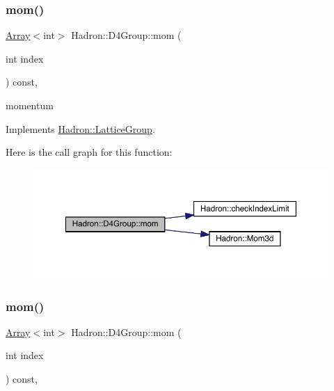 \subsubsection{\texorpdfstring{mom()}{mom()}\hspace{0.1cm}{\footnotesize\ttfamily [1/3]}}
{\footnotesize\ttfamily \mbox{\hyperlink{classXMLArray_1_1Array}{Array}}$<$int$>$ Hadron\+::\+D4\+Group\+::mom (\begin{DoxyParamCaption}\item[{int}]{index }\end{DoxyParamCaption}) const\hspace{0.3cm}{\ttfamily [inline]}, {\ttfamily [virtual]}}

momentum 

Implements \mbox{\hyperlink{structHadron_1_1LatticeGroup_ad577b65041dd9a6e84b1f3bd49cb8fce}{Hadron\+::\+Lattice\+Group}}.

Here is the call graph for this function\+:
\nopagebreak
\begin{figure}[H]
\begin{center}
\leavevmode
\includegraphics[width=350pt]{de/d5e/structHadron_1_1D4Group_aeb999dc93b1a1a99ed4ffd53977a163b_cgraph}
\end{center}
\end{figure}
\mbox{\label{structHadron_1_1D4Group_aeb999dc93b1a1a99ed4ffd53977a163b}} 
\subsubsection{\texorpdfstring{mom()}{mom()}\hspace{0.1cm}{\footnotesize\ttfamily [2/3]}}
{\footnotesize\ttfamily \mbox{\hyperlink{classXMLArray_1_1Array}{Array}}$<$int$>$ Hadron\+::\+D4\+Group\+::mom (\begin{DoxyParamCaption}\item[{int}]{index }\end{DoxyParamCaption}) const\hspace{0.3cm}{\ttfamily [inline]}, {\ttfamily [virtual]}}

